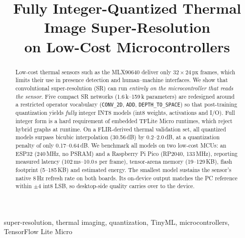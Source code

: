 \documentclass[conference,a4paper]{IEEEtran}
\begin{document}
\title{Fully Integer-Quantized Thermal Image Super-Resolution\\
on Low-Cost Microcontrollers}

\author{
}

\maketitle

\begin{abstract}
Low-cost thermal sensors such as the MLX90640 deliver only $32{\times}24$\,px
frames, which limits their use in presence detection and human--machine
interfaces. We show that convolutional super-resolution (SR) can run
\emph{entirely on the microcontroller that reads the sensor}. Five compact SR
networks (1.6\,k--159\,k parameters) are redesigned around a restricted
operator vocabulary (\texttt{CONV\_2D}, \texttt{ADD},
\texttt{DEPTH\_TO\_SPACE}) so that post-training quantization yields
\emph{fully} integer INT8 models (int8 weights, activations and I/O). Full
integer form is a hard requirement of embedded TFLite Micro runtimes, which
reject hybrid graphs at runtime. On a FLIR-derived thermal validation set,
all quantized models surpass bicubic interpolation (30.56\,dB) by
0.2--2.0\,dB, at a quantization penalty of only 0.17--0.64\,dB. We benchmark
all models on two low-cost MCUs: an ESP32 (240\,MHz, no PSRAM) and a
Raspberry Pi Pico (RP2040, 133\,MHz), reporting measured latency
(102\,ms--10.0\,s per frame), tensor-arena memory (19--129\,KB), flash
footprint (5--185\,KB) and estimated energy. The smallest model sustains the
sensor's native 8\,Hz refresh rate on both boards. Its on-device output
matches the PC reference within $\pm$4 int8 LSB, so desktop-side quality
carries over to the device.
\end{abstract}

\begin{IEEEkeywords}
super-resolution, thermal imaging, quantization, TinyML, microcontrollers,
TensorFlow Lite Micro
\end{IEEEkeywords}
\end{document}
